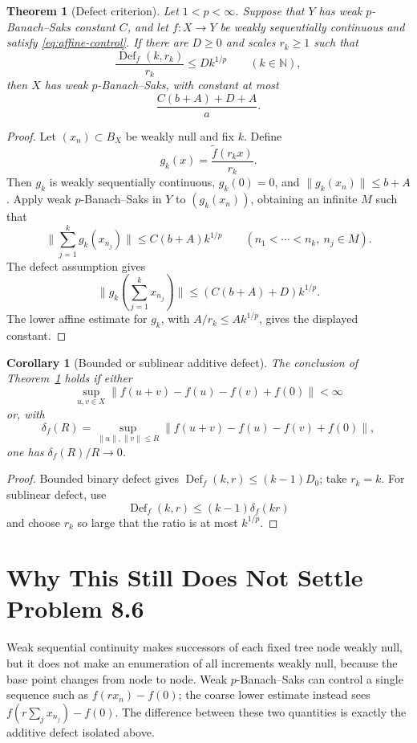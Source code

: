 \documentclass[11pt]{article}
\newtheorem{theorem}{Theorem}
\newtheorem{corollary}{Corollary}
\newcommand{\N}{\mathbb N}
\newcommand{\Def}{\operatorname{Def}}
\newcommand{\norm}[1]{\lVert #1\rVert}
\begin{document}
\begin{theorem}[Defect criterion]\label{thm:defect}
Let \(1<p<\infty\).  Suppose that \(Y\) has weak \(p\)-Banach--Saks constant
\(C\), and let \(f:X\to Y\) be weakly sequentially continuous and satisfy
\eqref{eq:affine-control}.  If there are \(D\ge0\) and scales \(r_k\ge1\)
such that
\[
 \frac{\Def_f(k,r_k)}{r_k}\le Dk^{1/p}\qquad(k\in\N),
\]
then \(X\) has weak \(p\)-Banach--Saks, with constant at most
\[
 \frac{C(b+A)+D+A}{a}.
\]
\end{theorem}

\begin{proof}
Let \((x_n)\subset B_X\) be weakly null and fix \(k\).  Define
\[
 g_k(x)=\frac{\widetilde f(r_kx)}{r_k}.
\]
Then \(g_k\) is weakly sequentially continuous, \(g_k(0)=0\), and
\(\norm{g_k(x_n)}\le b+A\).  Apply weak \(p\)-Banach--Saks in \(Y\) to
\((g_k(x_n))\), obtaining an infinite \(M\) such that
\[
 \norm{\sum_{j=1}^k g_k(x_{n_j})}
 \le C(b+A)k^{1/p}
 \qquad(n_1<\cdots<n_k,\ n_j\in M).
\]
The defect assumption gives
\[
 \norm{g_k(\sum_{j=1}^k x_{n_j})}
 \le (C(b+A)+D)k^{1/p}.
\]
The lower affine estimate for \(g_k\), with \(A/r_k\le Ak^{1/p}\), gives the
displayed constant.
\end{proof}

\begin{corollary}[Bounded or sublinear additive defect]
The conclusion of Theorem~\ref{thm:defect} holds if either
\[
 \sup_{u,v\in X}\norm{f(u+v)-f(u)-f(v)+f(0)}<\infty
\]
or, with
\[
 \delta_f(R)=\sup_{\norm u,\norm v\le R}
 \norm{f(u+v)-f(u)-f(v)+f(0)},
\]
one has \(\delta_f(R)/R\to0\).
\end{corollary}

\begin{proof}
Bounded binary defect gives \(\Def_f(k,r)\le(k-1)D_0\); take \(r_k=k\).  For
sublinear defect, use
\[
 \Def_f(k,r)\le(k-1)\delta_f(kr)
\]
and choose \(r_k\) so large that the ratio is at most \(k^{1/p}\).
\end{proof}

\section*{Why This Still Does Not Settle Problem 8.6}

Weak sequential continuity makes successors of each fixed tree node weakly
null, but it does not make an enumeration of all increments weakly null,
because the base point changes from node to node.  Weak \(p\)-Banach--Saks can
control a single sequence such as \(f(rx_n)-f(0)\); the coarse lower estimate
instead sees \(f(r\sum_jx_{n_j})-f(0)\).  The difference between these two
quantities is exactly the additive defect isolated above.
\end{document}
